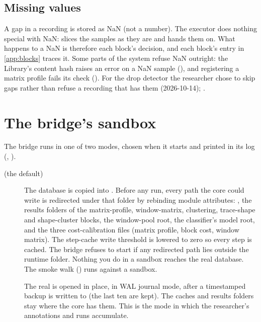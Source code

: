 \subsection{Missing values}
A gap in a recording is stored as NaN (not a number). The executor does nothing special with NaN:
 slices the samples as they are and hands them on. What happens to a NaN is
therefore each block's decision, and each block's entry in \cref{app:blocks} traces it. Some parts
of the system refuse NaN outright: the Library's content hash raises an error on a NaN sample
(), and registering a matrix profile fails its
 check (). For the drop detector the researcher chose to
skip gaps rather than refuse a recording that has them (2026-10-14);
.

\section{The bridge's sandbox}\label{sec:architecture-sandbox}
The bridge runs in one of two modes, chosen when it starts and printed in its log
(, ).

\begin{description}
\item[ (the default)] The database is copied into
  . Before any run, every path the core could write is redirected
  under that folder by rebinding module attributes: , the
  results folders of the matrix-profile, window-matrix, clustering, trace-shape and shape-cluster
  blocks, the window-pool root, the classifier's model root, and the three cost-calibration files
  (matrix profile, block cost, window matrix).
  The step-cache write threshold is lowered to zero so every step is cached. The bridge refuses to
  start if any redirected path lies outside the runtime folder. Nothing you do in a sandbox reaches
  the real database. The smoke walk () runs against a sandbox.
\item[] The real  is opened in place, in WAL
  journal mode, after a timestamped backup is written to  (the last ten are
  kept). The caches and results folders stay where the core has them. This is the mode in which
  the researcher's annotations and runs accumulate.
\end{description}

